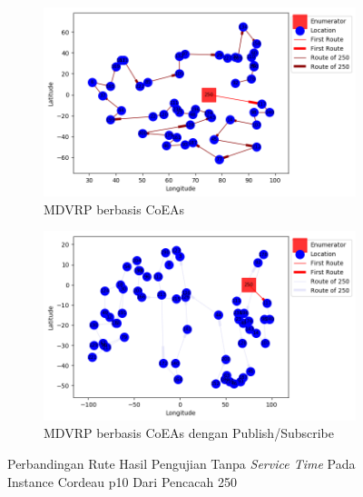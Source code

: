 \begin{figure}[H]
	\centering
	\begin{subfigure}[t]{\textwidth}
		\centering
		\includegraphics[width=\textwidth]{Resources/Images/cordeau_p10/cordeau_p10_notw_250_coes}
		\caption{MDVRP berbasis CoEAs}
		\label{fig:cordeau_p10_notw_250_coes}
	\end{subfigure}
	\begin{subfigure}[t]{\textwidth}
		\centering
		\includegraphics[width=\textwidth]{Resources/Images/cordeau_p10/cordeau_p10_notw_250_pubsub_coes}
		\caption{MDVRP berbasis CoEAs dengan Publish/Subscribe}
		\label{fig:cordeau_p10_notw_250_pubsub_coes}
	\end{subfigure}
	\caption{Perbandingan Rute Hasil Pengujian Tanpa \textit{Service Time} Pada Instance Cordeau p10 Dari Pencacah 250}
	\label{fig:cordeau_p10_notw_250}
\end{figure}


